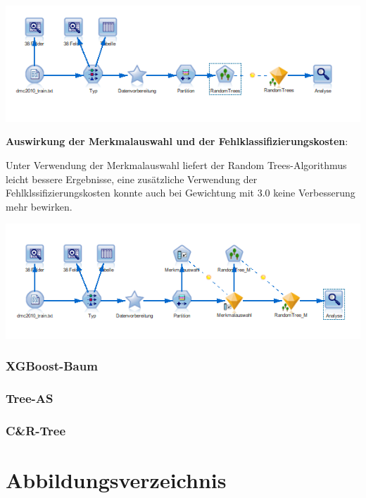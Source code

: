 \documentclass[a4paper,12pt]{article}
\newcounter{Algorithmus}
\begin{document}
\begin{center}
\includegraphics[width=\textwidth]{Screens/random_trees}
\end{center}

{\bf Auswirkung der Merkmalauswahl und der Fehlklassifizierungskosten}:
\par
Unter Verwendung der Merkmalauswahl liefert der Random Trees-Algorithmus leicht bessere Ergebnisse, eine zusätzliche Verwendung der Fehlklssifizierungskosten konnte auch bei Gewichtung mit 3.0 keine Verbesserung mehr bewirken.

\begin{center}
\includegraphics[width=\textwidth]{Screens/random_trees_m}
\end{center}

\subsubsection{XGBoost-Baum}

\subsubsection{Tree-AS}
\subsubsection{C\&R-Tree}


\newpage
\section{Abbildungsverzeichnis}
\listoffigures
\newpage
\end{document}
